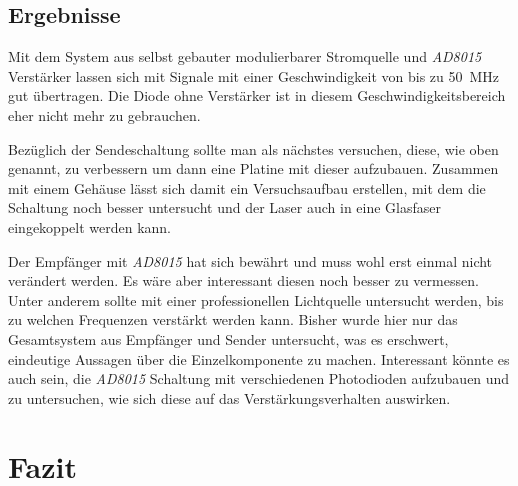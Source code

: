 \documentclass[12pt,a4paper]{article}
\begin{document}
\subsection{Ergebnisse}
Mit dem System aus selbst gebauter modulierbarer Stromquelle und \textit{AD8015} Verstärker lassen sich mit Signale mit einer Geschwindigkeit von bis zu \SI{50}{\mega\hertz} gut übertragen. Die Diode ohne Verstärker ist in diesem Geschwindigkeitsbereich eher nicht mehr zu gebrauchen.

Bezüglich der Sendeschaltung sollte man als nächstes versuchen, diese, wie oben genannt, zu verbessern um dann eine Platine mit dieser aufzubauen. Zusammen mit einem Gehäuse lässt sich damit ein Versuchsaufbau erstellen, mit dem die Schaltung noch besser untersucht und der Laser auch in eine Glasfaser eingekoppelt werden kann.

Der Empfänger mit \textit{AD8015} hat sich bewährt und muss wohl erst einmal nicht verändert werden. Es wäre aber interessant diesen noch besser zu vermessen. Unter anderem sollte mit einer professionellen Lichtquelle untersucht werden, bis zu welchen Frequenzen verstärkt werden kann. Bisher wurde hier nur das Gesamtsystem aus Empfänger und Sender untersucht, was es erschwert, eindeutige Aussagen über die Einzelkomponente zu machen. Interessant könnte es auch sein, die \textit{AD8015} Schaltung mit verschiedenen Photodioden aufzubauen und zu untersuchen, wie sich diese auf das Verstärkungsverhalten auswirken.

\section{Fazit}
\end{document}
